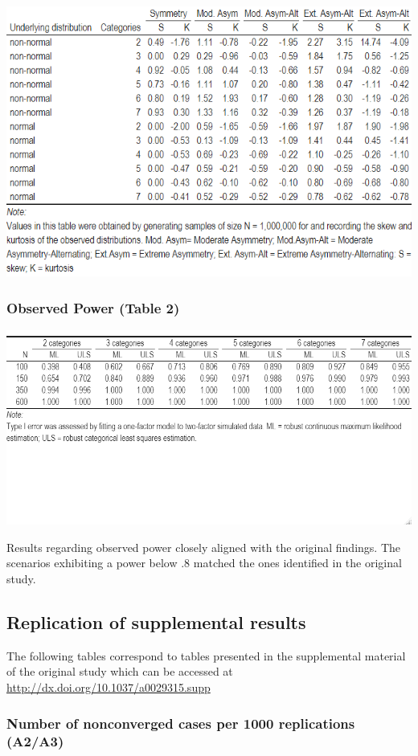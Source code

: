 \documentclass[10,a4paperpaper,]{article}
\begin{document}
\includegraphics[width=385pt]{./figures/table1}

\subsubsection{Observed Power (Table 2)}

\includegraphics[width=385pt]{./figures/table2}

Results regarding observed power closely aligned with the original
findings. The scenarios exhibiting a power below .8 matched the ones
identified in the original study.

\subsection{Replication of supplemental results}

The following tables correspond to tables presented in the supplemental
material of the original study which can be accessed at
\url{http://dx.doi.org/10.1037/a0029315.supp}

\subsubsection{Number of nonconverged cases per 1000 replications (A2/A3)}
\end{document}
